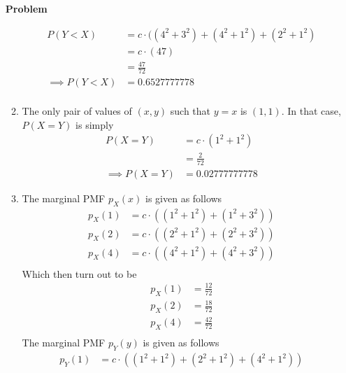 \documentclass[12pt]{article}
\newenvironment{Ex}{\textbf{Problem}\vspace{.75em}\\}{}
\begin{document}
\begin{enumerate}
\begin{Ex}
\begin{solution}
\begin{enumerate}
\begin{equation}
\begin{aligned}
            P(Y<X) &= c\cdot((4^2+3^2) + (4^2+1^2) + (2^2+1^2) \\
            &= c\cdot(47) \\
            &= \frac{47}{72} \\
            \implies P(Y<X) &= 0.6527777778 \\
          \end{aligned}
        \end{equation}
      \item The only pair of values of $(x,y)$ such that $y=x$ is
        $(1,1)$. In that case, $P(X=Y)$ is simply
        \begin{equation}
          \label{eq:2c-sol}
          \begin{aligned}
            P(X=Y) &= c\cdot(1^2 + 1^2) \\
            &= \frac{2}{72} \\
            \implies P(X=Y) &= 0.02777777778
          \end{aligned}
        \end{equation}
      \item The marginal PMF $p_X(x)$ is given as follows
        \begin{equation}
          \label{eq:2d-marginal-x}
          \begin{aligned}
            p_X(1) &= c\cdot((1^2+1^2) + (1^2+3^2)) \\
            p_X(2) &= c\cdot((2^2+1^2) + (2^2+3^2)) \\
            p_X(4) &= c\cdot((4^2+1^2) + (4^2+3^2)) \\
          \end{aligned}
        \end{equation}
        Which then turn out to be
        \begin{equation}
          \label{eq:2d-marginal-x-values}
          \begin{aligned}
            p_X(1) &= \frac{12}{72} \\
            p_X(2) &= \frac{18}{72} \\
            p_X(4) &= \frac{42}{72} \\
          \end{aligned}
        \end{equation}
        The marginal PMF $p_Y(y)$ is given as follows
        \begin{equation}
          \label{eq:2d-marginal-y}
          \begin{aligned}
            p_Y(1) &= c\cdot((1^2+1^2) + (2^2+1^2) + (4^2+1^2))\\

\end{aligned}
\end{equation}
\end{enumerate}
\end{solution}
\end{Ex}
\end{enumerate}
\end{document}
